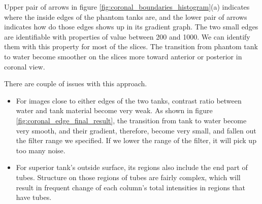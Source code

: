 Upper pair of arrows in figure \ref{fig:coronal_boundaries_histogram}(a) indicates where the inside edges of
the phantom tanks are, and the lower pair of arrows indicates how do those edges shows up in its gradient graph.
The two small edges are identifiable with properties of value between 200 and 1000. We can identify them with
this property for most of the slices. The transition from phantom tank to water become smoother on the slices
more toward anterior or posterior in coronal view. 

There are couple of issues with this approach.
\begin{itemize}
  \item For images close to either edges of the two tanks, contrast ratio between water and tank material 
    become very weak. As shown in figure \ref{fig:coronal_edge_final_result}, the transition from tank to
    water become very smooth, and their gradient, therefore, become very small, and fallen out the filter
    range we specified. If we lower the range of the filter, it will pick up too many noise.
  \item For superior tank's outside surface, its regions also include the end part of tubes. Structure
    on those regions of tubes are fairly complex, which will result in frequent change of each column's 
    total intensities in regions that have tubes.
\end{itemize}

